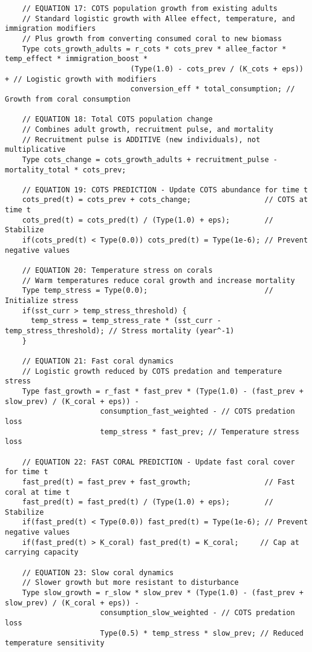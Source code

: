 \begin{lstlisting}
    // EQUATION 17: COTS population growth from existing adults
    // Standard logistic growth with Allee effect, temperature, and immigration modifiers
    // Plus growth from converting consumed coral to new biomass
    Type cots_growth_adults = r_cots * cots_prev * allee_factor * temp_effect * immigration_boost * 
                             (Type(1.0) - cots_prev / (K_cots + eps)) + // Logistic growth with modifiers
                             conversion_eff * total_consumption; // Growth from coral consumption
    
    // EQUATION 18: Total COTS population change
    // Combines adult growth, recruitment pulse, and mortality
    // Recruitment pulse is ADDITIVE (new individuals), not multiplicative
    Type cots_change = cots_growth_adults + recruitment_pulse - mortality_total * cots_prev;
    
    // EQUATION 19: COTS PREDICTION - Update COTS abundance for time t
    cots_pred(t) = cots_prev + cots_change;                 // COTS at time t
    cots_pred(t) = cots_pred(t) / (Type(1.0) + eps);        // Stabilize
    if(cots_pred(t) < Type(0.0)) cots_pred(t) = Type(1e-6); // Prevent negative values
    
    // EQUATION 20: Temperature stress on corals
    // Warm temperatures reduce coral growth and increase mortality
    Type temp_stress = Type(0.0);                           // Initialize stress
    if(sst_curr > temp_stress_threshold) {
      temp_stress = temp_stress_rate * (sst_curr - temp_stress_threshold); // Stress mortality (year^-1)
    }
    
    // EQUATION 21: Fast coral dynamics
    // Logistic growth reduced by COTS predation and temperature stress
    Type fast_growth = r_fast * fast_prev * (Type(1.0) - (fast_prev + slow_prev) / (K_coral + eps)) - 
                      consumption_fast_weighted - // COTS predation loss
                      temp_stress * fast_prev; // Temperature stress loss
    
    // EQUATION 22: FAST CORAL PREDICTION - Update fast coral cover for time t
    fast_pred(t) = fast_prev + fast_growth;                 // Fast coral at time t
    fast_pred(t) = fast_pred(t) / (Type(1.0) + eps);        // Stabilize
    if(fast_pred(t) < Type(0.0)) fast_pred(t) = Type(1e-6); // Prevent negative values
    if(fast_pred(t) > K_coral) fast_pred(t) = K_coral;     // Cap at carrying capacity
    
    // EQUATION 23: Slow coral dynamics
    // Slower growth but more resistant to disturbance
    Type slow_growth = r_slow * slow_prev * (Type(1.0) - (fast_prev + slow_prev) / (K_coral + eps)) - 
                      consumption_slow_weighted - // COTS predation loss
                      Type(0.5) * temp_stress * slow_prev; // Reduced temperature sensitivity
    

\end{lstlisting}
